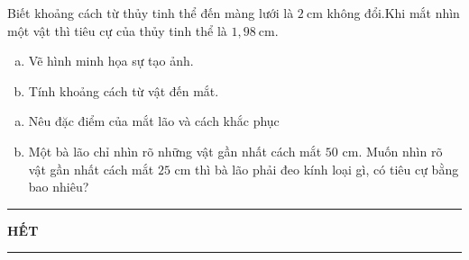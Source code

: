 \begin{bt}[$2{,}0$ điểm]Biết khoảng cách từ thủy tinh thể đến màng lưới là $2\mathrm{~cm}$ không đổi.Khi mắt nhìn một vật thì tiêu cự của thủy tinh thể là $1{,}98\mathrm{~cm}$.
	\begin{enumerate}[a)]
		\item Vẽ hình minh họa sự tạo ảnh.
		\item Tính khoảng cách từ vật đến mắt.
	\end{enumerate}
	\loigiai{}
\end{bt}
\begin{bt}[$2{,}0$ điểm]
	\begin{enumerate}[a)]
		\item Nêu đặc điểm của mắt lão và cách khắc phục
		\item Một bà lão chỉ nhìn rõ những vật gần nhất cách mắt $50$ cm. Muốn nhìn rõ vật gần nhất cách mắt $25$ cm thì bà lão phải đeo kính loại gì, có tiêu cự bằng bao nhiêu?
	\end{enumerate}
	\loigiai{}
\end{bt}
\fileend
\begin{center}
	\rule[4pt]{2cm}{1pt}\large \textbf{HẾT}\rule[4pt]{2cm}{1pt}
\end{center}











